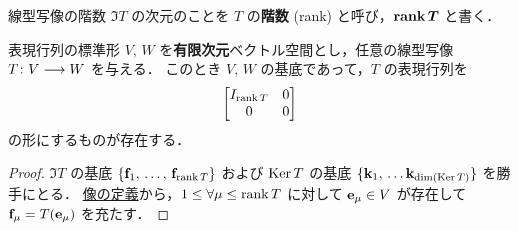 \documentclass[rep_main]{subfiles}
\begin{document}
\begin{mydef}[label=def:rank]{線型写像の階数}
	$\Im T$ の次元のことを $T$ の\textbf{階数} (rank) と呼び，$\bm{\rank T}$ と書く．
\end{mydef}

\begin{myprop}[label=prop:canonical-matrix]{表現行列の標準形}
	$V,\, W$ を\textbf{有限次元}ベクトル空間とし，任意の線型写像 $T \colon V \longrightarrow W$ を与える．
	このとき $V,\, W$ の基底であって，$T$ の表現行列を
	\begin{align}
		\mqty[I_{\rank T} & 0 \\ 0 & 0]
	\end{align}
	の形にするものが存在する．
\end{myprop}

\begin{proof}
	$\Im T$ の基底 $\{\vb{f}_1,\, \dots,\, \vb{f}_{\rank T}\}$ および $\operatorname{Ker} T$ の基底 $\{\vb{k}_1,\, \dots \vb{k}_{\dim (\operatorname{Ker} T)}\}$ を勝手にとる．
	\hyperref[def:ker-module]{像の定義}から，$1 \le \forall \mu \le \rank T$ に対して $\vb{e}_\mu \in V$ が存在して $\vb{f}_\mu = T(\vb{e}_\mu)$ を充たす．
	

\end{proof}
\end{document}
